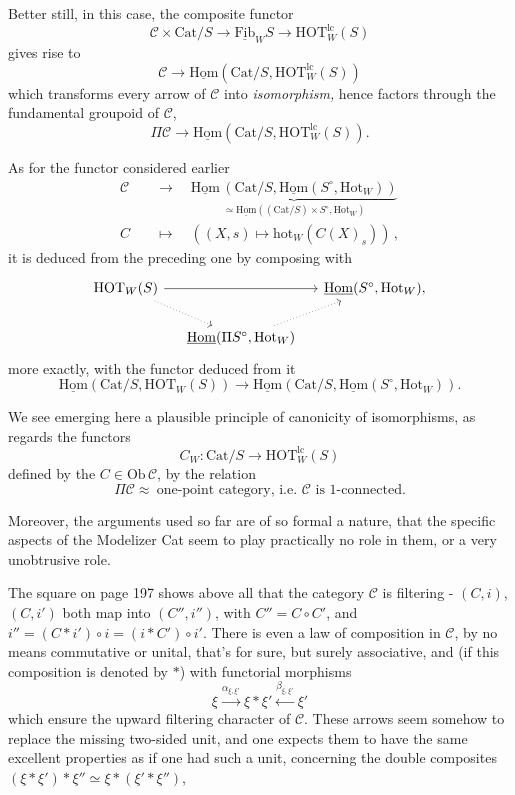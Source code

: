 \documentclass[11pt]{article}
\newcommand{\printedpage}[1]{\marginpar{\footnotesize p.~#1}}
\newcommand{\msp}[1]{\marginpar{\footnotesize [#1]}}
\newcommand{\Hom}{\underline{\mathrm{Hom}}}
\newcommand{\Fib}{\underline{\mathrm{Fib}}}
\newcommand{\Cat}{\mathrm{Cat}}
\newcommand{\HOT}{\mathrm{HOT}}
\newcommand{\Hot}{\mathrm{Hot}}
\newcommand{\hot}{\mathrm{hot}}
\begin{document}
Better still, in this case, the composite functor
\[
\mathcal{C} \times \Cat/S \longrightarrow \Fib_W S \longrightarrow \HOT^{\mathrm{lc}}_W(S)
\]
gives rise to
\[
\mathcal{C} \longrightarrow \Hom(\Cat/S, \HOT^{\mathrm{lc}}_W(S))
\]
which transforms every arrow of $\mathcal{C}$ into \textit{isomorphism,} hence factors through the fundamental groupoid of $\mathcal{C}$,
\[
\Pi\mathcal{C} \longrightarrow \Hom(\Cat/S, \HOT^{\mathrm{lc}}_W(S)).
\]

\msp{page 200}As for the functor considered earlier
\[
\begin{aligned}
\mathcal{C} &\quad\longrightarrow\quad \underbrace{\Hom\,(\Cat/S, \Hom(S^\circ, \Hot_W))}_{\simeq\Hom((\Cat/S)\times S^\circ, \Hot_W)} \\
C &\quad\longmapsto\quad ((X,s) \longmapsto \hot_W(C(X)_s))\,,
\end{aligned}
\]
it is deduced from the preceding one by composing with
\[
\begin{tikzcd}[column sep=small]
\HOT_W(S) \arrow[rr] \arrow[dr, dotted] & & \Hom(S^\circ, \Hot_W), \\
 & \Hom(\Pi S^\circ, \Hot_W) \arrow[ur, dotted] &
\end{tikzcd}
\]
more exactly, with the functor deduced from it
\[
\Hom(\Cat/S, \HOT_W(S)) \longrightarrow \Hom(\Cat/S, \Hom(S^\circ, \Hot_W)).
\]

We see emerging here a plausible principle of canonicity of isomorphisms, as regards the functors
\[
C_W : \Cat/S \longrightarrow \HOT^{\mathrm{lc}}_W(S)
\]
defined by the $C \in \mathrm{Ob}\,\mathcal{C}$, by the relation
\[
\Pi\mathcal{C} \approx \ \text{one-point category, i.e. } \mathcal{C} \text{ is 1-connected.}
\]

Moreover, the arguments used so far are of so formal a nature, that the specific aspects of the Modelizer Cat
\printedpage{132}
\msp{page 201}seem to play practically no role in them, or a very unobtrusive role.

The square on page 197 shows above all that the category $\mathcal{C}$ is filtering - $(C,i)$, $(C,i')$ both map into $(C'',i'')$, with $C'' = C \circ C'$, and $i'' = (C * i') \circ i = (i * C') \circ i'$. There is even a law of composition in $\mathcal{C}$, by no means commutative or unital, that's for sure, but surely associative, and (if this composition is denoted by $*$) with functorial morphisms %
\[
\xi \xrightarrow{\alpha_{\xi,\xi'}} \xi * \xi' \xleftarrow{\beta_{\xi,\xi'}} \xi'
\]
which ensure the upward filtering character of $\mathcal{C}$. These arrows seem somehow to replace the missing two-sided unit, and one expects them to have the same excellent properties as if one had such a unit, concerning the double composites $(\xi * \xi') * \xi'' \simeq \xi * (\xi' * \xi'')$,
\end{document}
